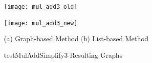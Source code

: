\documentclass[12pt,openany,a4paper]{book}
\begin{document}
\begin{figure}[H]
    \begin{minipage}[l]{0.4\textwidth}
        \texttt{[image: mul\_add3\_old]}
    \end{minipage}
    \hspace{0.18\textwidth}
    \begin{minipage}[l]{0.4\textwidth}
        \texttt{[image: mul\_add3\_new]}
    \end{minipage}
    \hspace*{0.03\textwidth}
    (a) Graph-based Method
    \hspace{0.25\textwidth}
    (b) List-based Method
    \caption{testMulAddSimplify3 Resulting Graphs}
    \label{mulsimp3}
\end{figure}

\cleardoublepage
\end{document}
